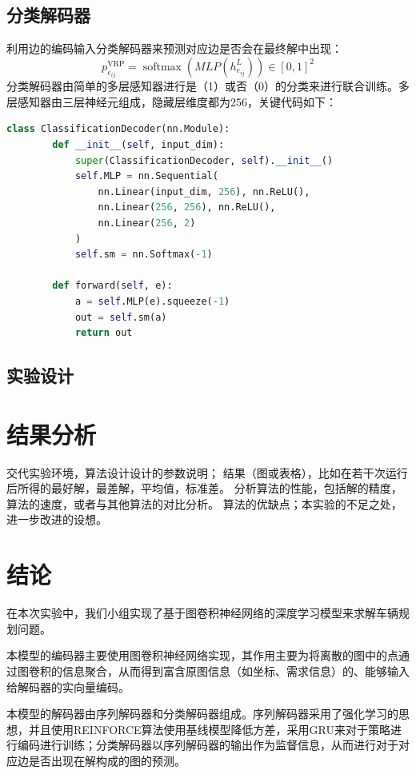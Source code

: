 \documentclass[withoutpreface,bwprint]{cumcmthesis} %
\begin{document}
\subsection{分类解码器}
	利用边的编码输入分类解码器来预测对应边是否会在最终解中出现：
	$$
	p_{e_{i j}}^{\mathrm{VRP}}=\operatorname{softmax}\left(M L P\left(h_{e_{i j}}^{L}\right)\right) \in[0,1]^{2}
	$$
	分类解码器由简单的多层感知器进行是（1）或否（0）的分类来进行联合训练。多层感知器由三层神经元组成，隐藏层维度都为256，关键代码如下：
\begin{lstlisting}[language=python]
	class ClassificationDecoder(nn.Module):
	    def __init__(self, input_dim):
	        super(ClassificationDecoder, self).__init__()
	        self.MLP = nn.Sequential(
	            nn.Linear(input_dim, 256), nn.ReLU(),
	            nn.Linear(256, 256), nn.ReLU(),
	            nn.Linear(256, 2)
	        )
	        self.sm = nn.Softmax(-1)
	
	    def forward(self, e):
	        a = self.MLP(e).squeeze(-1)
	        out = self.sm(a)
	        return out
\end{lstlisting}

\subsection{实验设计}

\section{结果分析}
	
   交代实验环境，算法设计设计的参数说明；
   结果（图或表格），比如在若干次运行后所得的最好解，最差解，平均值，标准差。
   分析算法的性能，包括解的精度，算法的速度，或者与其他算法的对比分析。
   算法的优缺点；本实验的不足之处，进一步改进的设想。
\section{结论}
	在本次实验中，我们小组实现了基于图卷积神经网络的深度学习模型来求解车辆规划问题。
	
	本模型的编码器主要使用图卷积神经网络实现，其作用主要为将离散的图中的点通过图卷积的信息聚合，从而得到富含原图信息（如坐标、需求信息）的、能够输入给解码器的实向量编码。
	
	本模型的解码器由序列解码器和分类解码器组成。序列解码器采用了强化学习的思想，并且使用REINFORCE算法使用基线模型降低方差，采用GRU来对于策略进行编码进行训练；分类解码器以序列解码器的输出作为监督信息，从而进行对于对应边是否出现在解构成的图的预测。
	
\end{document}
